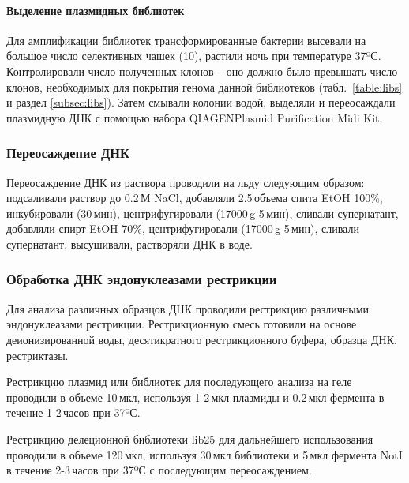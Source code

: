 \paragraph{Выделение плазмидных библиотек}
\label{subsec:bac_plasm_kit}
Для амплификации библиотек трансформированные бактерии высевали на большое число селективных чашек (10), растили ночь при температуре 37ºС. Контролировали число полученных клонов -- оно должно было превышать число клонов, необходимых для покрытия генома данной библиотеков (табл.~\ref{table:libs} и раздел \ref{subsec:libs}). Затем смывали колонии водой, выделяли и переосаждали плазмидную ДНК с помощью набора QIAGEN\textregistered Plasmid Purification Midi Kit.

\subsubsection{Переосаждение ДНК}
\label{subsec:dna_prec}

Переосаждение ДНК из раствора проводили на льду следующим образом: подсаливали раствор до 0.2\,М NaCl, добавляли 2.5\,объема спита EtOH 100\%,  инкубировали (30\,мин), центрифугировали (17000\,g 5\,мин), сливали супернатант, добавляли спирт EtOH 70\%, центрифугировали (17000\,g 5\,мин), сливали супернатант, высушивали, растворяли ДНК в воде.

\subsubsection{Обработка ДНК эндонуклеазами рестрикции} \label{sec:restriction}
	Для анализа различных образцов ДНК проводили рестрикцию различными эндонуклеазами рестрикции. Рестрикционную смесь готовили на основе деионизированной воды, десятикратного рестрикционного буфера, образца ДНК, рестриктазы.
	
	Рестрикцию плазмид или библиотек для последующего анализа на геле проводили в объеме 10\,мкл, используя 1-2\,мкл плазмиды и 0.2\,мкл фермента в течение 1-2\,часов при 37ºС.
	
	Рестрикцию делеционной библиотеки lib25 для дальнейшего использования проводили в объеме 120\,мкл, используя 30\,мкл библиотеки и 5\,мкл фермента NotI в течение 2-3\,часов при 37ºС с последующим переосаждением.

